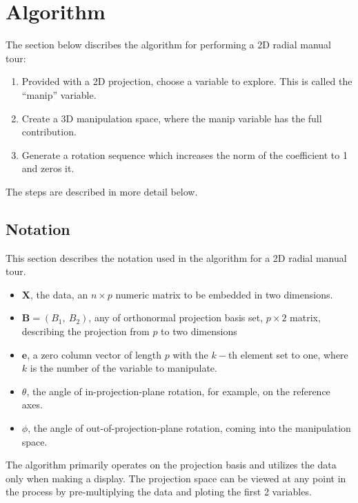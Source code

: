 \documentclass{monashthesis}
\begin{document}
\section{Algorithm}\label{sec:algorithm}

The section below discribes the algorithm for performing a 2D radial
manual tour:

\begin{enumerate}
\def\labelenumi{\arabic{enumi}.}
\tightlist
\item
  Provided with a 2D projection, choose a variable to explore. This is
  called the ``manip'' variable.
\item
  Create a 3D manipulation space, where the manip variable has the full
  contribution.
\item
  Generate a rotation sequence which increases the norm of the
  coefficient to 1 and zeros it.
\end{enumerate}

The steps are described in more detail below.

\subsection{Notation}\label{notation}

This section describes the notation used in the algorithm for a 2D
radial manual tour.

\begin{itemize}
  \item $\textbf{X}$, the data, an $n \times p$ numeric matrix to be embedded in two dimensions.
  \item $\textbf{B} = (B_1,~ B_2)$, any of orthonormal projection basis set, $p \times 2$ matrix, describing the projection from $p$ to two dimensions
  \item $\textbf{e}$, a zero column vector of length $p$ with the $k-$th element set to one, where $k$ is the number of the variable to manipulate.
  \item $\theta$, the angle of in-projection-plane rotation, for example, on the reference axes. 
  \item $\phi$, the angle of out-of-projection-plane rotation, coming into the manipulation space.
\end{itemize}

The algorithm primarily operates on the projection basis and utilizes
the data only when making a display. The projection space can be viewed
at any point in the process by pre-multiplying the data and ploting the
first 2 variables.
\end{document}
